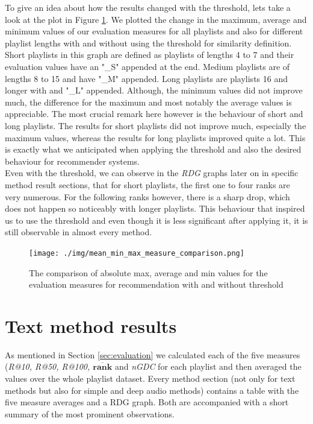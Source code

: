 To give an idea about how the results changed with the threshold, lets take a look at the plot in Figure \ref{fig:absolute_value_comparison}. We plotted the change in the maximum, average and minimum values of our evaluation measures for all playlists and also for different playlist lengths with and without using the threshold for similarity definition. Short playlists in this graph are defined as playlists of lengths 4 to 7 and their evaluation values have an "\_S" appended at the end. Medium playlists are of lengths 8 to 15 and have "\_M" appended. Long playlists are playlists 16 and longer with and "\_L" appended. Although, the minimum values did not improve much, the difference for the maximum and most notably the average values is appreciable. The most crucial remark here however is the behaviour of short and long playlists. The results for short playlists did not improve much, especially the maximum values, whereas the results for long playlists improved quite a lot. This is exactly what we anticipated when applying the threshold and also the desired behaviour for recommender systems. \\
Even with the threshold, we can observe in the \textit{RDG} graphs later on in specific method result sections, that for short playlists, the first one to four ranks are very numerous. For the following ranks however, there is a sharp drop, which does not happen so noticeably with longer playlists. This behaviour that inspired us to use the threshold and even though it is less significant after applying it, it is still observable in almost every method. \\

\begin{figure}[h!]
    \centering
	\texttt{[image: ./img/mean\_min\_max\_measure\_comparison.png]}
	\caption{The comparison of absolute max, average and min values for the evaluation measures for recommendation with and without threshold}
	\label{fig:absolute_value_comparison}
\end{figure}


\section{Text method results}\label{sec:text_results}

As mentioned in Section \ref{sec:evaluation} we calculated each of the five measures (\textit{R@10, R@50, R@100, $ \boldsymbol{\overline{rank}} $} and \textit{nGDC} for each playlist and then averaged the values over the whole playlist dataset. Every method section (not only for text methods but also for simple and deep audio methods) contains a table with the five measure averages and a RDG graph. Both are accompanied with a short summary of the most prominent observations.

